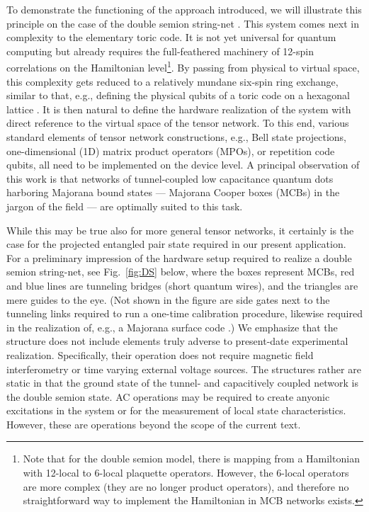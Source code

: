 \documentclass[twocolumn,floats,prx,showpacs]{revtex4-1}
\begin{document}
To demonstrate the functioning of the approach introduced, we will illustrate this principle on the case of the double semion string-net \cite{Levin2005}. This system comes next in complexity to the elementary toric code. It  is not yet universal for quantum computing  but already requires the full-feathered machinery of 12-spin correlations on the Hamiltonian level\footnote{Note that for the double semion model, there is mapping from a Hamiltonian with 12-local to 6-local plaquette operators. However, the 6-local operators are more complex (they are no longer  product operators), and therefore no straightforward way to implement the Hamiltonian in  MCB networks exists.}.  By passing from physical to virtual space, this complexity gets reduced to a relatively mundane six-spin ring exchange, similar to that, e.g.,   defining the physical qubits of a toric code on a hexagonal lattice \cite{Vijay2015}.  It is then natural to define the hardware realization of the system with direct reference to the virtual space of the tensor network. To this end, various standard elements of tensor network constructions, e.g.,  Bell state projections, one-dimensional (1D) matrix product operators (MPOs), or repetition code qubits, all need to be implemented on the device level. A principal observation of this work is that networks of tunnel-coupled low capacitance quantum dots harboring Majorana bound states  --- Majorana Cooper boxes (MCBs) in the jargon of the field \cite{Beri2012,Beri2013,Altland2013,Plugge2017,Karzig2017} --- are optimally suited to this task. 

While this may be true also for more general tensor networks, it certainly is the case for the projected entangled pair state required in our present application.  For a preliminary impression of the hardware setup required to realize a double semion string-net, see Fig.~\ref{fig:DS} below, where the boxes represent MCBs, red and blue lines are tunneling bridges (short quantum wires), and the triangles are mere guides to the eye. (Not shown in the figure are side gates next to the tunneling links required to run a one-time calibration procedure, likewise required in the realization of, e.g., a Majorana surface code 
\cite{PhysRevLett.116.050501,PhysRevB.94.174514,PhysRevLett.108.260504,PhysRevX.6.031016,Hoffman16,Roy2017}.) We emphasize that the structure does not include elements truly adverse to present-date experimental realization. Specifically, their operation does not require magnetic field interferometry or time varying external voltage sources. The structures rather are static in that the ground state of the tunnel- and capacitively coupled network is the double semion state. AC operations may be required to create anyonic excitations in the system or for the measurement of local state characteristics. However, these are operations beyond the scope of the current text. 
\end{document}
